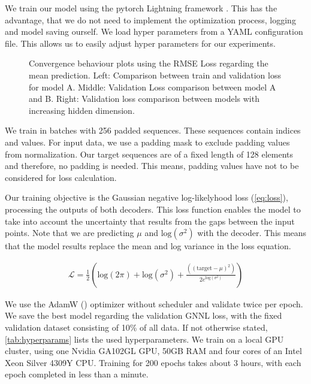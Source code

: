 We train our model using the pytorch Lightning framework \cite{falcon2019pytorch}. This has the advantage, that we do not need to implement the optimization process, logging and model saving ourself. We load hyper parameters from a YAML configuration file. This allows us to easily adjust hyper parameters for our experiments.

\begin{figure*}
	\centering
	\resizebox{0.9\textwidth}{!}{
		
		
		
	}
	\caption{Convergence behaviour plots using the RMSE Loss regarding the mean prediction. Left: Comparison between train and validation loss for model A. Middle: Validation Loss comparison between model A and B. Right: Validation loss comparison between models with increasing hidden dimension.}
	\label{fig:loss_plot}
\end{figure*}

We train in batches with 256 padded sequences. These sequences contain indices and values. For input data, we use a padding mask to exclude padding values from normalization. Our target sequences are of a fixed length of 128 elements and therefore, no padding is needed. This means, padding values have not to be considered for loss calculation.

Our training objective is the Gaussian negative log-likelyhood loss (\autoref{eq:loss}), processing the outputs of both decoders. This loss function enables the model to take into account the uncertainty that results from the gaps between the input points. Note that we are predicting $\mu$ and $\text{log} (\sigma^2)$ with the decoder. This means that the model results replace the mean and log variance in the loss equation.

\begin{align}
\mathcal{L} = \frac{1}{2}\left(\text{log}(2\pi) + \text{log}(\sigma^2) + \frac{((\text{target} - \mu)^2)}{2 e^{\text{log}(\sigma^2)}}\right) \label{eq:loss}
\end{align}

We use the AdamW (\citet{loshchilov2017fixing}) optimizer without scheduler and validate twice per epoch. We save the best model regarding the validation GNNL loss, with the fixed validation dataset consisting of 10\% of all data. If not otherwise stated, \autoref{tab:hyperparams} lists the used hyperparameters. We train on a local GPU cluster, using one Nvidia GA102GL GPU, 50GB RAM and four cores of an Intel Xeon Silver 4309Y CPU. Training for 200 epochs takes about 3 hours, with each epoch completed in less than a minute.

